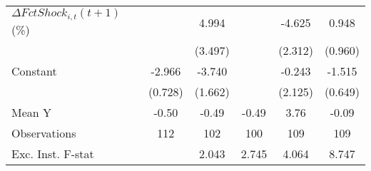 {\begin{tabular}{l*{5}{c}}
\addlinespace
$ \Delta FctShock_{i,t}(t+1)$ (\%)&                     &       4.994         &                     &      -4.625\sym{*}  &       0.948         \\
                    &                     &     (3.497)         &                     &     (2.312)         &     (0.960)         \\
\addlinespace
Constant            &      -2.966\sym{***}&      -3.740\sym{**} &                     &      -0.243         &      -1.515\sym{**} \\
                    &     (0.728)         &     (1.662)         &                     &     (2.125)         &     (0.649)         \\
\midrule
Mean Y              &       -0.50         &       -0.49         &       -0.49         &        3.76         &       -0.09         \\
Observations        &         112         &         102         &         100         &         109         &         109         \\
Exc. Inst. F-stat   &                     &       2.043         &       2.745         &       4.064         &       8.747         \\
\bottomrule
\end{tabular}
}
